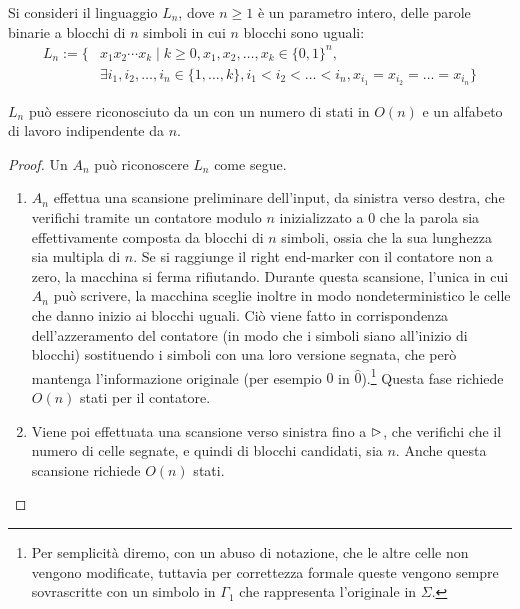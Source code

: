 Si consideri il linguaggio $L_n$, dove $n\geq1$ è un parametro intero, delle parole binarie a blocchi di $n$ simboli in cui $n$ blocchi sono uguali:
\begin{align*}
	L_n := \{ & x_1x_2\cdots x_k\mid k\geq0, x_1,x_2,\dots,x_k\in\{0,1\}^n,                                  \\
	          & \exists i_1,i_2,\dots,i_n\in\{1,\dots,k\},i_1<i_2<\dots<i_n, x_{i_1}=x_{i_2}=\dots=x_{i_n}\}
\end{align*}

\begin{theor}
	$L_n$ può essere riconosciuto da un  con un numero di stati in $O(n)$ e un alfabeto di lavoro indipendente da $n$.
\end{theor}
\begin{proof}
	Un  $A_n$ può riconoscere $L_n$ come segue.
	\begin{enumerate}
		\item $A_n$ effettua una scansione preliminare dell'input, da sinistra verso destra, che verifichi tramite un contatore modulo $n$ inizializzato a $0$ che la parola sia effettivamente composta da blocchi di $n$ simboli, ossia che la sua lunghezza sia multipla di $n$. Se si raggiunge il right end-marker con il contatore non a zero, la macchina si ferma rifiutando. Durante questa scansione, l'unica in cui $A_n$ può scrivere, la macchina sceglie inoltre in modo nondeterministico le celle che danno inizio ai blocchi uguali. Ciò viene fatto in corrispondenza dell'azzeramento del contatore (in modo che i simboli siano all'inizio di blocchi) sostituendo i simboli con una loro versione segnata, che però mantenga l'informazione originale (per esempio $0$ in $\hat 0$).\footnote{Per semplicità diremo, con un abuso di notazione, che le altre celle non vengono modificate, tuttavia per correttezza formale queste vengono sempre sovrascritte con un simbolo in $\Gamma_1$ che rappresenta l'originale in $\Sigma$.} Questa fase richiede $O(n)$ stati per il contatore.
		\item Viene poi effettuata una scansione verso sinistra fino a $\rhd$, che verifichi che il numero di celle segnate, e quindi di blocchi candidati, sia $n$. Anche questa scansione richiede $O(n)$ stati.

\end{enumerate}
\end{proof}
